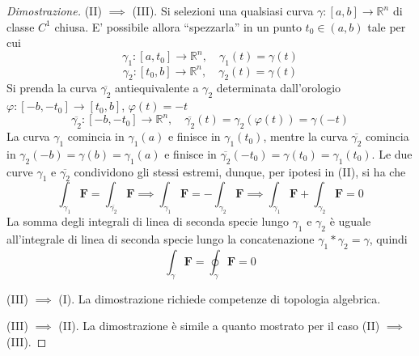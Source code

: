 \begin{proof}[Dimostrazione]
                (II) $\implies$ (III). Si selezioni una qualsiasi curva $\gamma: [a, b] \rightarrow \mathbb{R}^{n}$ di classe $C^{1}$ chiusa. E' possibile allora ``spezzarla'' in un punto $t_{0} \in (a, b)$ tale per cui
                \[
                    \gamma_{1}: [a, t_{0}] \rightarrow \mathbb{R}^{n}, \quad \gamma_{1}(t) = \gamma(t)
                \]
                \[
                    \gamma_{2}: [t_{0}, b] \rightarrow \mathbb{R}^{n}, \quad \gamma_{2}(t) = \gamma(t)
                \]
                Si prenda la curva $\overline{\gamma_{2}}$ antiequivalente a $\gamma_{2}$ determinata dall'orologio $\varphi: [-b, -t_{0}] \rightarrow [t_{0}, b]$, $\varphi(t) = -t$
                \[
                    \overline{\gamma_{2}}: [-b, -t_{0}] \rightarrow \mathbb{R}^{n}, \quad \overline{\gamma_{2}}(t) = \gamma_{2}(\varphi(t)) = \gamma(-t)
                \]
                La curva $\gamma_{1}$ comincia in $\gamma_{1}(a)$ e finisce in $\gamma_{1}(t_{0})$, mentre la curva $\overline{\gamma_{2}}$ comincia in $\gamma_{2}(-b) = \gamma(b) = \gamma_{1}(a)$ e finisce in $\overline{\gamma_{2}}(-t_{0}) = \gamma(t_{0}) = \gamma_{1}(t_{0})$.
                Le due curve $\gamma_{1}$ e $\overline{\gamma_{2}}$ condividono gli stessi estremi, dunque, per ipotesi in (II), si ha che
                \[
                    \int_{\gamma_{1}} \mathbf{F} = \int_{\overline{\gamma_{2}}} \mathbf{F} \implies \int_{\gamma_{1}} \mathbf{F} = - \int_{\gamma_{2}} \mathbf{F} \implies \int_{\gamma_{1}} \mathbf{F} + \int_{\gamma_{2}} \mathbf{F} = 0
                \]
                La somma degli integrali di linea di seconda specie lungo $\gamma_{1}$ e $\gamma_{2}$ è uguale all'integrale di linea di seconda specie lungo la concatenazione $\gamma_{1} * \gamma_{2} = \gamma$, quindi
                \[
                    \int_{\gamma} \mathbf{F} = \oint_{\gamma} \mathbf{F} = 0
                \]

                (III) $\implies$ (I). La dimostrazione richiede competenze di topologia algebrica.

                (III) $\implies$ (II). La dimostrazione è simile a quanto mostrato per il caso (II) $\implies$ (III).
            \end{proof}


